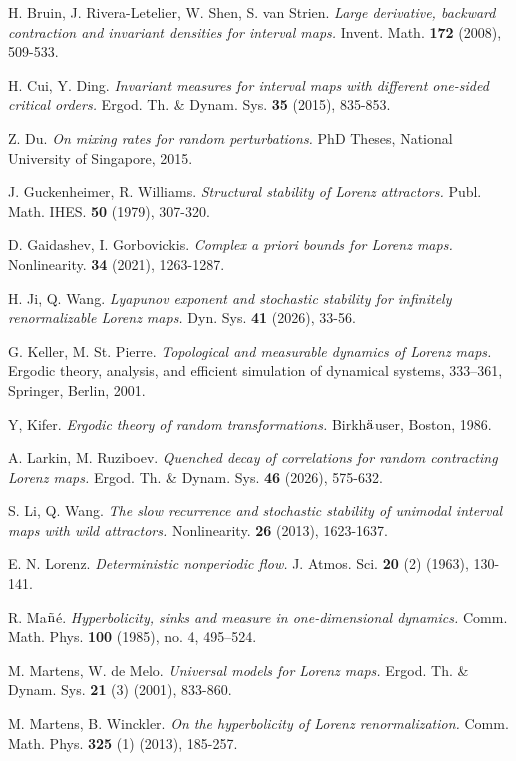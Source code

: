 \documentclass[11pt,oneside]{article}
\theoremstyle{plain}
\numberwithin{equation}{section}
\numberwithin{figure}{section}
\numberwithin{table}{section}
\begin{document}
\begin{thebibliography}{}
H. Bruin, J. Rivera-Letelier, W. Shen, S. van Strien. {\it Large derivative, backward contraction and invariant densities for interval maps.} Invent. Math. {\bf 172} (2008), 509-533.


H. Cui, Y. Ding. {\it Invariant measures for interval maps with different one-sided critical orders.} Ergod. Th. \& Dynam. Sys. {\bf 35} (2015), 835-853.

Z. Du. {\it On mixing rates for random perturbations.} PhD Theses, National University of Singapore, 2015.

J. Guckenheimer, R. Williams. {\it Structural stability of Lorenz attractors.} Publ. Math. IHES. {\bf 50} (1979), 307-320.

D. Gaidashev, I. Gorbovickis. {\it Complex a priori bounds for Lorenz maps.} Nonlinearity. {\bf 34} (2021), 1263-1287.


H. Ji, Q. Wang. {\it Lyapunov exponent and stochastic stability for infinitely renormalizable Lorenz maps.} Dyn. Sys.  {\bf 41} (2026), 33-56. 

G. Keller, M. St. Pierre. {\it Topological and measurable dynamics of Lorenz maps.} Ergodic theory, analysis, and efficient simulation of dynamical systems, 333–361, Springer, Berlin, 2001. 

Y, Kifer. {\it Ergodic theory of random transformations.} Birkh${\ddot {\rm a}}$user, Boston, 1986.

A. Larkin, M. Ruziboev. {\it Quenched decay of correlations for random contracting Lorenz maps.} Ergod. Th. \& Dynam. Sys. {\bf 46} (2026), 575-632.

S. Li, Q. Wang. {\it The slow recurrence and stochastic stability of unimodal interval maps with wild attractors.} Nonlinearity. {\bf 26} (2013), 1623-1637.

E. N. Lorenz. {\it Deterministic nonperiodic flow.} J. Atmos. Sci. {\bf 20} (2) (1963), 130-141.


R. Ma${\rm \tilde{n}}$\'e. {\it Hyperbolicity, sinks and measure in one-dimensional dynamics.} Comm. Math. Phys. {\bf 100} (1985), no. 4, 495–524.


M. Martens, W. de Melo. {\it Universal models for Lorenz maps.} Ergod. Th. \& Dynam. Sys. {\bf 21} (3) (2001), 833-860.


M. Martens, B. Winckler. {\it On the hyperbolicity of Lorenz renormalization.} Comm. Math. Phys. {\bf 325} (1) (2013), 185-257.



\end{thebibliography}
\end{document}
